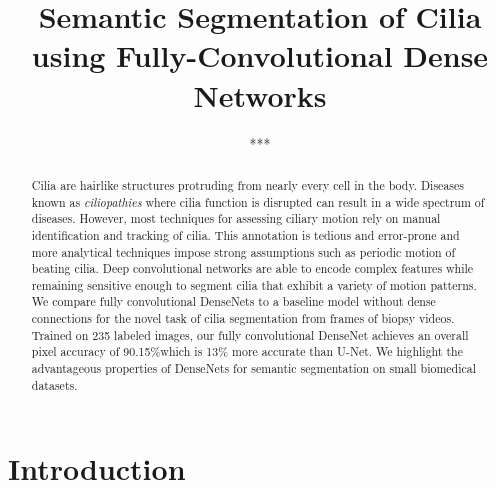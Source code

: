 \documentclass{llncs}
\begin{document}
\frontmatter          %
\pagestyle{headings}  %
\mainmatter              %


\title{Semantic Segmentation of Cilia using Fully-Convolutional Dense Networks}
\author{***}
\authorrunning{} %
\tocauthor{}
\institute{***\\
\email{***}}
\maketitle              %


\begin{abstract}
Cilia are hairlike structures protruding from nearly every cell in the body. Diseases known as \textit{ciliopathies} where cilia function is disrupted can result in a wide spectrum of diseases. However, most techniques for assessing ciliary motion rely on manual identification and tracking of cilia. This annotation is tedious and error-prone and more analytical techniques impose strong assumptions such as periodic motion of beating cilia. Deep convolutional networks are able to encode complex features while remaining sensitive enough to segment cilia that exhibit a variety of motion patterns. We compare fully convolutional DenseNets to a baseline model without dense connections for the novel task of cilia segmentation from frames of biopsy videos. Trained on 235 labeled images, our fully convolutional DenseNet achieves an overall pixel accuracy of 90.15\%which is 13\% more accurate than U-Net. We highlight the advantageous properties of DenseNets for semantic segmentation on small biomedical datasets.

\end{abstract}


\section{Introduction}
\end{document}
